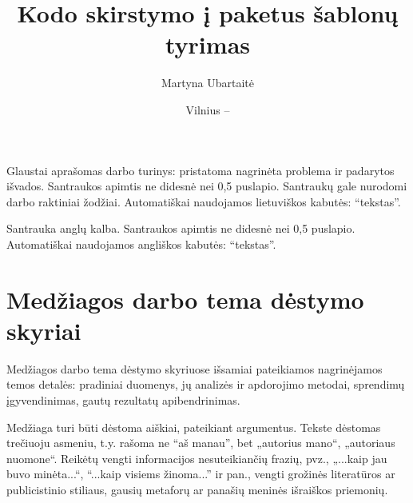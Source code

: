 \documentclass[
]{VUMIFPSbakalaurinis}
\title{Kodo skirstymo į paketus šablonų tyrimas}
\author{Martyna Ubartaitė}
\date{Vilnius – \the\year}
\begin{document}
\maketitle


\begin{lithuanian}
Glaustai aprašomas darbo turinys: pristatoma nagrinėta problema ir padarytos
išvados. Santraukos apimtis ne didesnė nei 0,5 puslapio. Santraukų gale
nurodomi darbo raktiniai žodžiai. Automatiškai naudojamos lietuviškos kabutės: \enquote{tekstas}.

\end{lithuanian}

\begin{english}
Santrauka anglų kalba. Santraukos apimtis ne didesnė nei 0,5 puslapio. Automatiškai naudojamos angliškos kabutės: \enquote{tekstas}.

\end{english}

\tableofcontents









\section{Medžiagos darbo tema dėstymo skyriai}
Medžiagos darbo tema dėstymo skyriuose išsamiai pateikiamos nagrinėjamos temos
detalės: pradiniai duomenys, jų analizės ir apdorojimo metodai, sprendimų
įgyvendinimas, gautų rezultatų apibendrinimas.

Medžiaga turi būti dėstoma aiškiai, pateikiant argumentus. Tekste dėstomas
trečiuoju asmeniu, t.y. rašoma ne \enquote{aš manau}, bet „autorius mano“, „autoriaus
nuomone“. Reikėtų vengti informacijos nesuteikiančių frazių, pvz., „...kaip jau
buvo minėta...“, \enquote{...kaip visiems žinoma...} ir pan., vengti grožinės
literatūros ar publicistinio stiliaus, gausių metaforų ar panašių meninės
išraiškos priemonių.
\end{document}
